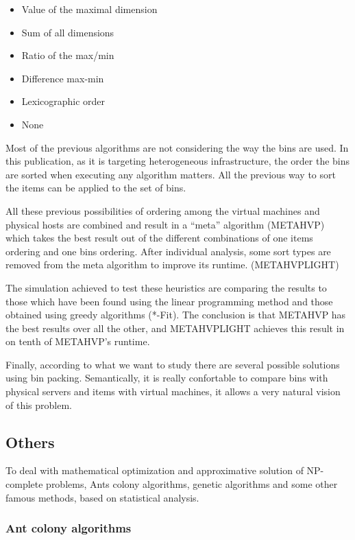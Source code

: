 \documentclass[a4paper,11pt]{article}
\begin{document}
\begin{itemize}
	\item Value of the maximal dimension
	\item Sum of all dimensions
	\item Ratio of the max/min
	\item Difference max-min
	\item Lexicographic order
	\item None
\end{itemize}

Most of the previous algorithms are not considering the way the bins are used.
In this publication, as it is targeting heterogeneous infrastructure, the order
the bins are sorted when executing any algorithm matters. All the previous way to
sort the items can be applied to the set of bins.

All these previous possibilities of ordering among the virtual machines and physical
hosts are combined and result in a “meta” algorithm (METAHVP) which takes the best result
out of the different combinations of one items ordering and one bins ordering. After
individual analysis, some sort types are removed from the meta algorithm to improve
its runtime. (METAHVPLIGHT)

The simulation achieved to test these heuristics are comparing the results to those
which have been found using the linear programming method and those obtained using
greedy algorithms (*-Fit). The conclusion is that METAHVP has the best results over
all the other, and METAHVPLIGHT achieves this result in on tenth of METAHVP's runtime.

Finally, according to what we want to study there are several possible solutions using
bin packing. Semantically, it is really confortable to compare bins with physical servers
and items with virtual machines, it allows a very natural vision of this problem.

\subsection{Others}

To deal with mathematical optimization and approximative solution of NP-complete problems,
Ants colony algorithms, genetic algorithms and some other famous methods, based on statistical
analysis.

\subsubsection{Ant colony algorithms}
\end{document}
